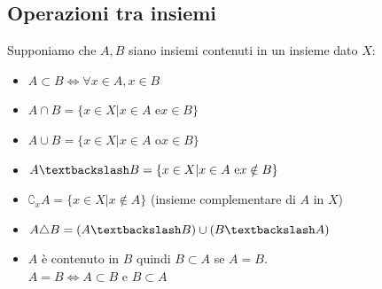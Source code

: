 \documentclass{article}
\theoremstyle{definition}
\begin{document}
\subsection{Operazioni tra insiemi}
Supponiamo che $A,B$ siano insiemi contenuti in un insieme dato $X$:
\begin{itemize}
    \item $A \subset B \Longleftrightarrow \forall x \in A, x \in B$
    \item $A \cap B =\{x \in X | x \in A \,\, \mbox{e} x \in B\}$
    \item $A \cup B= \{x \in X| x \in A \,\, \mbox{o} x \in B\}$
    \item $A \textbackslash B = \{x \in X | x \in A \,\, \mbox{e} x \notin B\}$
    \item $\complement_x A =\{x \in X | x \notin A\}$ (insieme complementare di $A$ in $X$)
    \item $A \triangle B = (A \textbackslash B) \cup (B \textbackslash A)$
    \item $A$ è contenuto in $B$ quindi $B \subset A$ se $A=B$.
    \\ $A=B \Longleftrightarrow A \subset B$ e $B \subset A$

\end{itemize}
\end{document}
